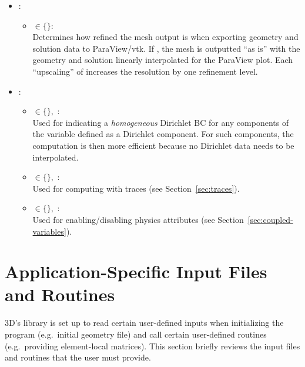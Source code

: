 \begin{itemize}
{\begin{itemize}
{			}
		\end{itemize}
	}
	\item
	{
		 : 
		\begin{itemize}
			\item { $\in \{$$\}$:\\
			Determines how refined the mesh output is when exporting geometry and solution data to ParaView/vtk. If , the mesh is outputted ``as is'' with the geometry and solution linearly interpolated for the ParaView plot. Each ``upscaling'' of  increases the resolution by one refinement level.
			}
		\end{itemize}
	}
	\item
	{
		 :
		\begin{itemize}
			\item{  $\in \{$$\},$ :\\
			Used for indicating a \emph{homogeneous} Dirichlet BC for any components of the variable defined as a Dirichlet component. For such components, the computation is then more efficient because no Dirichlet data needs to be interpolated.
			}
			\item{  $\in \{$$\},$ :\\ 
			Used for computing with traces (see Section~\ref{sec:traces}).
			}
			\item{  $\in \{$$\},$ :\\ 
			Used for enabling/disabling physics attributes (see Section~\ref{sec:coupled-variables}).
			}
		\end{itemize}
	}
\end{itemize}

\section{Application-Specific Input Files and Routines}
\label{sec:simple-example}

\hp3D's library is set up to read certain user-defined inputs when initializing the program (e.g.~initial geometry file) and call certain user-defined routines (e.g.~providing element-local matrices). This section briefly reviews the input files and routines that the user must provide.

